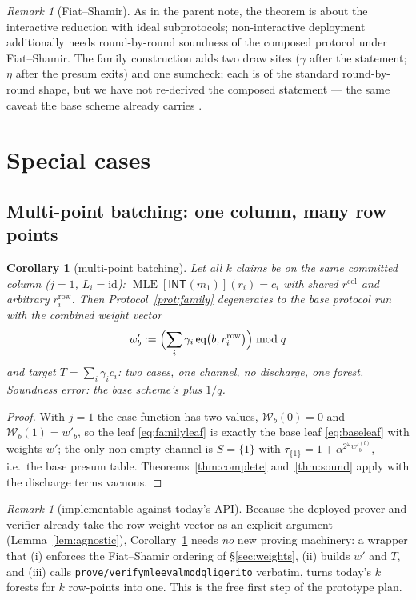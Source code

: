 \documentclass[11pt]{article}
\newcommand{\INT}{\mathsf{INT}}
\newcommand{\eq}{\mathsf{eq}}
\newcommand{\Wc}{\mathcal{W}}          %
\DeclareRobustCommand{\code}[1]{{\def\_{\textunderscore\allowbreak}\texttt{#1}}}
\DeclareMathOperator{\MLE}{MLE}
\theoremstyle{plain}
\newtheorem{corollary}[theorem]{Corollary}
\theoremstyle{definition}
\theoremstyle{remark}
\newtheorem{remark}[theorem]{Remark}
\begin{document}
\begin{remark}[Fiat--Shamir]\label{rem:fs}
As in the parent note, the theorem is about the interactive reduction with
ideal subprotocols; non-interactive deployment additionally needs
round-by-round soundness of the composed protocol under Fiat--Shamir. The
family construction adds two draw sites ($\gamma$ after the statement;
$\eta$ after the presum exits) and one sumcheck; each is of the standard
round-by-round shape, but we have not re-derived the composed statement ---
the same caveat the base scheme already carries \cite{Xnote,F2Zdesign}.
\end{remark}

\section{Special cases}\label{sec:special}

\subsection{Multi-point batching: one column, many row points}

\begin{corollary}[multi-point batching]\label{cor:multipoint}
Let all $k$ claims be on the \emph{same} committed column ($j=1$,
$L_i=\mathrm{id}$): $\MLE[\INT(m_1)](r_i)=c_i$ with shared
$r^{\mathrm{col}}$ and arbitrary $r^{\mathrm{row}}_i$. Then
Protocol~\ref{prot:family} degenerates to the \emph{base} protocol run with
the combined weight vector
\[
  w'_b := \Bigl(\sum_i \gamma_i\,\eq\bigl(b,r_i^{\mathrm{row}}\bigr)\Bigr)\bmod q
\]
and target $T=\sum_i\gamma_ic_i$: two cases, one channel, \emph{no}
discharge, one forest. Soundness error: the base scheme's plus $1/q$.
\end{corollary}

\begin{proof}
With $j=1$ the case function has two values, $\Wc_b(0)=0$ and
$\Wc_b(1)=w'_b$, so the leaf \eqref{eq:familyleaf} is exactly the base leaf
\eqref{eq:baseleaf} with weights $w'$; the only non-empty channel is
$S=\{1\}$ with $\tau_{\{1\}}=1+\alpha^{2^{\omega}w'^{(l)}_b}$, i.e.\ the base
presum table. Theorems~\ref{thm:complete} and~\ref{thm:sound} apply with the
discharge terms vacuous.
\end{proof}

\begin{remark}[implementable against today's API]\label{rem:api}
Because the deployed prover and verifier already take the row-weight vector
as an explicit argument (Lemma~\ref{lem:agnostic}), Corollary~\ref{cor:multipoint}
needs \emph{no} new proving machinery: a wrapper that (i) enforces the
Fiat--Shamir ordering of \S\ref{sec:weights}, (ii) builds $w'$ and $T$, and
(iii) calls \code{prove/verify\_mle\_eval\_mod\_q\_ligerito} verbatim,
turns today's $k$ forests for $k$ row-points into one. This is the free first
step of the prototype plan.
\end{remark}
\end{document}
